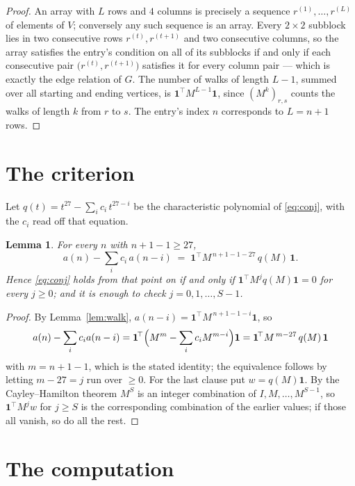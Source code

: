 \documentclass[11pt,a4paper]{article}
\theoremstyle{plain}
\newtheorem{lemma}[theorem]{Lemma}
\theoremstyle{definition}
\begin{document}
\begin{proof}
An array with $L$ rows and $4$ columns is precisely a sequence
$r^{(1)},\dots,r^{(L)}$ of elements of $V$; conversely any such sequence is an array.
Every $2\times2$ subblock lies in two consecutive rows $r^{(t)},r^{(t+1)}$ and two
consecutive columns, so the array satisfies the entry's condition on all of its subblocks
if and only if each consecutive pair $\bigl(r^{(t)},r^{(t+1)}\bigr)$ satisfies it for
every column pair --- which is exactly the edge relation of $G$. The number of walks of
length $L-1$, summed over all starting and ending vertices, is
$\mathbf{1}^{\!\top}M^{L-1}\mathbf{1}$, since $(M^{k})_{r,s}$ counts the walks of
length $k$ from $r$ to $s$. The entry's index $n$ corresponds to $L=n+1$ rows.
\end{proof}

\section{The criterion}

Let $q(t)=t^{27}-\sum_i c_i\,t^{27-i}$ be the characteristic polynomial of
\eqref{eq:conj}, with the $c_i$ read off that equation.

\begin{lemma}\label{lem:crit}
For every $n$ with $n+1-1\ge27$,
\[
a(n)-\sum_i c_i\,a(n-i)\;=\;\mathbf{1}^{\!\top}M^{\,n+1-1-27}\,q(M)\,\mathbf{1} .
\]
Hence \eqref{eq:conj} holds from that point on if and only if
$\mathbf{1}^{\!\top}M^{j}q(M)\mathbf{1}=0$ for every $j\ge0$; and it is enough to check
$j=0,1,\dots,S-1$.
\end{lemma}

\begin{proof}
By Lemma~\ref{lem:walk}, $a(n-i)=\mathbf{1}^{\!\top}M^{\,n+1-1-i}\mathbf{1}$, so
\[
a(n)-\sum_i c_i a(n-i)
=\mathbf{1}^{\!\top}\Bigl(M^{m}-\sum_i c_i M^{m-i}\Bigr)\mathbf{1}
=\mathbf{1}^{\!\top}M^{\,m-27}\,q(M)\,\mathbf{1}
\]
with $m=n+1-1$, which is the stated identity; the equivalence follows by letting
$m-27=j$ run over $\ge0$. For the last clause put $w=q(M)\mathbf{1}$. By the
Cayley--Hamilton theorem $M^{S}$ is an integer combination of $I,M,\dots,M^{S-1}$, so
$\mathbf{1}^{\!\top}M^{j}w$ for $j\ge S$ is the corresponding combination of the earlier
values; if those all vanish, so do all the rest.
\end{proof}

\section{The computation}
\end{document}
